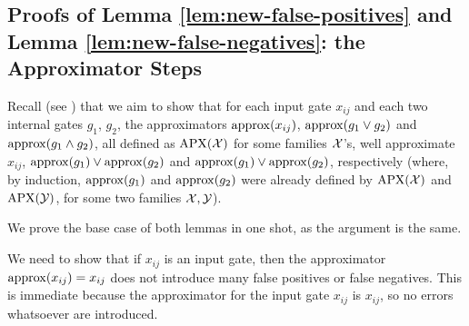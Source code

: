 \subsection{Proofs of Lemma \ref{lem:new-false-positives} and Lemma \ref{lem:new-false-negatives}: the Approximator Steps}

Recall (see ) that we aim to show that for each input gate $x_{ij}$ and each two internal gates $g_1$, $g_2$, the approximators ${\rm approx}(x_{ij})$, 
${\rm approx}(g_1\lor g_2)$ and ${\rm approx}(g_1\land g_2)$, all defined as $\mathrm{APX}(\mathcal{X})$ for some families $\mathcal{X}$'s, well 
approximate $x_{ij}$, ${\rm approx}(g_1)\lor{\rm approx}(g_2)$ and ${\rm approx}(g_1)\lor{\rm approx}(g_2)$, respectively (where, by induction, ${\rm approx}(g_1)$ and $ {\rm approx}(g_2)$ were already defined by $\mathrm{APX}(\mathcal{X})$ and $\mathrm{APX}(\mathcal{Y})$, for some two families $\mathcal{X},\mathcal{Y}$).

We prove the base  case of  both lemmas in one shot, as the argument is the same.  

We need to show that if $x_{ij}$ is an input gate, then the approximator ${\rm approx}(x_{ij})=x_{ij}$ does not introduce many false positives or false negatives. 
%
This is immediate because the approximator for the input gate $x_{ij}$ is $x_{ij}$, so no errors whatsoever are introduced.  







